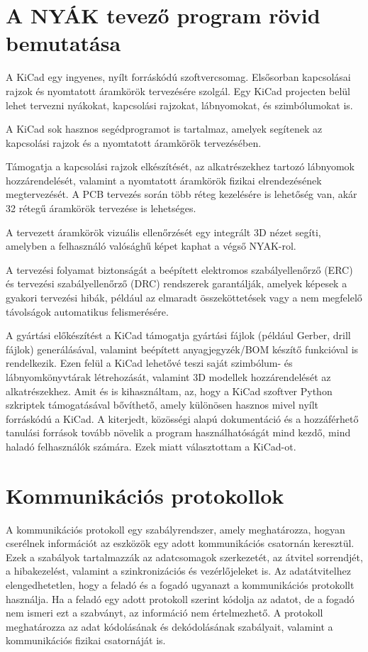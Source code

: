 \documentclass[a4paper,12pt,oneside]{book}
\begin{document}
\section{A NYÁK tevező program rövid bemutatása}
A KiCad egy ingyenes, nyílt forráskódú szoftvercsomag. Elsősorban kapcsolásai rajzok és nyomtatott áramkörök tervezésére szolgál. Egy KiCad projecten belül lehet tervezni nyákokat, kapcsolási rajzokat, lábnyomokat, és szimbólumokat is.

A KiCad sok hasznos segédprogramot is tartalmaz, amelyek segítenek az kapcsolási rajzok és a nyomtatott áramkörök tervezésében. 

Támogatja a kapcsolási rajzok elkészítését, az alkatrészekhez tartozó lábnyomok hozzárendelését, valamint a nyomtatott áramkörök fizikai elrendezésének megtervezését. A PCB tervezés során több réteg kezelésére is lehetőség van, akár 32 rétegű áramkörök tervezése is lehetséges. 

A tervezett áramkörök vizuális ellenőrzését egy integrált 3D nézet segíti, amelyben a felhasználó valósághű képet kaphat a végső NYAK-rol. 

A tervezési folyamat biztonságát a beépített elektromos szabályellenőrző (ERC) és tervezési szabályellenőrző (DRC) rendszerek garantálják, amelyek képesek a gyakori tervezési hibák, például az elmaradt összeköttetések vagy a nem megfelelő távolságok automatikus felismerésére. 

A gyártási előkészítést a KiCad támogatja gyártási fájlok (például Gerber, drill fájlok) generálásával, valamint beépített anyagjegyzék/BOM készítő funkcióval is rendelkezik. Ezen felül a KiCad lehetővé teszi saját szimbólum- és lábnyomkönyvtárak létrehozását, valamint 3D modellek hozzárendelését az alkatrészekhez. 
Amit és is kihasználtam, az, hogy a KiCad szoftver Python szkriptek támogatásával bővíthető, amely különösen hasznos mivel nyílt forráskódú a KiCad. A kiterjedt, közösségi alapú dokumentáció és a hozzáférhető tanulási források tovább növelik a program használhatóságát mind kezdő, mind haladó felhasználók számára. Ezek miatt választottam a KiCad-ot.

\section{Kommunikációs protokollok} %
A kommunikációs protokoll egy szabályrendszer, amely meghatározza, hogyan cserélnek információt az eszközök egy adott kommunikációs csatornán keresztül. Ezek a szabályok tartalmazzák az adatcsomagok szerkezetét, az átvitel sorrendjét, a hibakezelést, valamint a szinkronizációs és vezérlőjeleket is. Az adatátvitelhez elengedhetetlen, hogy a feladó és a fogadó ugyanazt a kommunikációs protokollt használja. Ha a feladó egy adott protokoll szerint kódolja az adatot, de a fogadó nem ismeri ezt a szabványt, az információ nem értelmezhető. A protokoll meghatározza az adat kódolásának és dekódolásának szabályait, valamint a kommunikációs fizikai csatornáját is.
\end{document}
